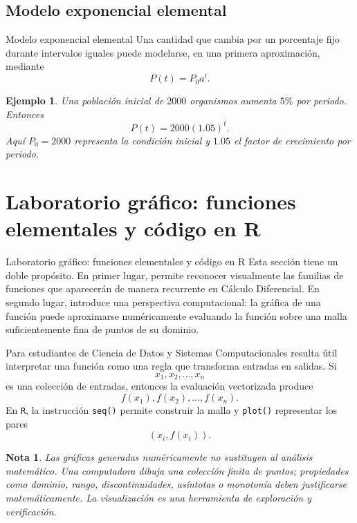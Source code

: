 \documentclass[aspectratio=169,10pt]{beamer}
\newtheorem{ejemplo}{Ejemplo}
\newtheorem{nota}{Nota}
\begin{document}
\subsection*{Modelo exponencial elemental}
\begin{frame}{Modelo exponencial elemental}
Una cantidad que cambia por un porcentaje fijo durante intervalos iguales puede
modelarse, en una primera aproximación, mediante
\[
P(t)=P_0a^t.
\]

\begin{ejemplo}
Una población inicial de $2000$ organismos aumenta $5\%$ por periodo. Entonces
\[
P(t)=2000(1.05)^t.
\]
Aquí $P_0=2000$ representa la condición inicial y $1.05$ el factor de
crecimiento por periodo.
\end{ejemplo}


\end{frame}
\section{Laboratorio gráfico: funciones elementales y código en R}
\begin{frame}{Laboratorio gráfico: funciones elementales y código en R}
Esta sección tiene un doble propósito. En primer lugar, permite reconocer
visualmente las familias de funciones que aparecerán de manera recurrente en
Cálculo Diferencial. En segundo lugar, introduce una perspectiva computacional:
la gráfica de una función puede aproximarse numéricamente evaluando la función
sobre una malla suficientemente fina de puntos de su dominio.

Para estudiantes de Ciencia de Datos y Sistemas Computacionales resulta útil
interpretar una función como una regla que transforma entradas en salidas. Si
\[
x_1,x_2,\ldots,x_n
\]
es una colección de entradas, entonces la evaluación vectorizada produce
\[
f(x_1),f(x_2),\ldots,f(x_n).
\]
En \texttt{R}, la instrucción \texttt{seq()} permite construir la malla y
\texttt{plot()} representar los pares
\[
(x_i,f(x_i)).
\]

\begin{nota}
Las gráficas generadas numéricamente no sustituyen al análisis matemático.
Una computadora dibuja una colección finita de puntos; propiedades como
dominio, rango, discontinuidades, asíntotas o monotonía deben justificarse
matemáticamente. La visualización es una herramienta de exploración y
verificación.
\end{nota}
\end{frame}
\end{document}
